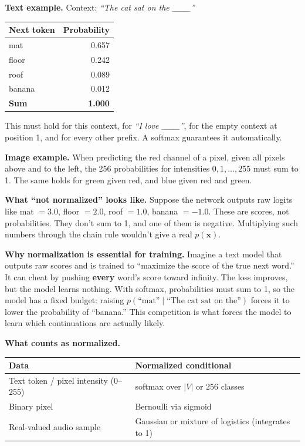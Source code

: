 \textbf{Text example.} Context: \textit{``The cat sat on the \_\_\_''}

\begin{center}
\begin{tabular}{lr}
\toprule
Next token & Probability \\
\midrule
mat    & 0.657 \\
floor  & 0.242 \\
roof   & 0.089 \\
banana & 0.012 \\
\midrule
\textbf{Sum} & \textbf{1.000} \\
\bottomrule
\end{tabular}
\end{center}

This must hold for this context, for \textit{``I love \_\_\_''}, for the empty context at position 1, and for every other prefix. A softmax guarantees it automatically.

\textbf{Image example.} When predicting the red channel of a pixel, given all pixels above and to the left, the 256 probabilities for intensities $0, 1, \dots, 255$ must sum to 1. The same holds for green given red, and blue given red and green.

\textbf{What ``not normalized'' looks like.} Suppose the network outputs raw logits like mat $=3.0$, floor $=2.0$, roof $=1.0$, banana $=-1.0$. These are scores, not probabilities. They don't sum to 1, and one of them is negative. Multiplying such numbers through the chain rule wouldn't give a real $p(\mathbf{x})$.

\textbf{Why normalization is essential for training.} Imagine a text model that outputs raw scores and is trained to ``maximize the score of the true next word.'' It can cheat by pushing \textbf{every} word's score toward infinity. The loss improves, but the model learns nothing. With softmax, probabilities must sum to 1, so the model has a fixed budget: raising $p(\text{``mat''} \mid \text{``The cat sat on the''})$ forces it to lower the probability of ``banana.'' This competition is what forces the model to learn which continuations are actually likely.

\textbf{What counts as normalized.}
\begin{center}
\begin{tabular}{ll}
\toprule
Data & Normalized conditional \\
\midrule
Text token / pixel intensity (0--255) & softmax over $|V|$ or 256 classes \\
Binary pixel & Bernoulli via sigmoid \\
Real-valued audio sample & Gaussian or mixture of logistics (integrates to 1) \\
\bottomrule
\end{tabular}
\end{center}

